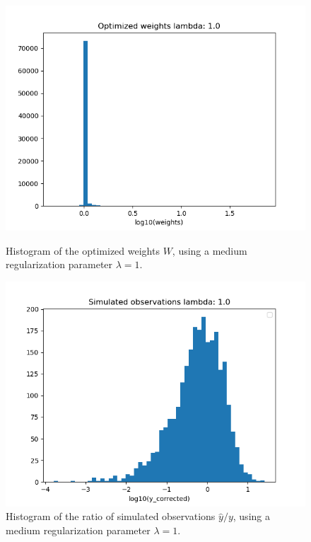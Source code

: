 \documentclass{article}
\begin{document}
\begin{figure}
	\centering
	\begin{minipage}{.48\textwidth}
		\centering
		\includegraphics[width=0.9\linewidth]{../plots/hfun_weights_lambda1.png}
		\caption{Histogram of the optimized weights $W$, using a medium regularization parameter $\lambda=1$.}
		\label{fig: optimized weights lambda=1}
	\end{minipage}\hfill
	\begin{minipage}{.48\textwidth}
		\centering
		\includegraphics[width=0.9\linewidth]{../plots/hfun_simulated_observations_lambda1.png}
		\caption{Histogram of the ratio of simulated observations $\hat{y}/y$, using a medium regularization parameter $\lambda=1$.}
		\label{fig: simulated observations lambda=1}
	\end{minipage}
\end{figure}
\end{document}
